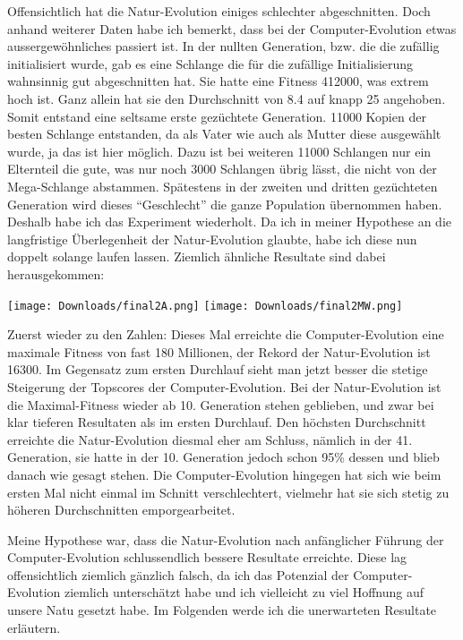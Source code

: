 \documentclass[11pt,a4paper,ngerman]{article}
\begin{document}
\bigskip
Offensichtlich hat die Natur-Evolution einiges schlechter abgeschnitten. Doch anhand weiterer Daten habe ich bemerkt, dass bei der Computer-Evolution etwas aussergewöhnliches passiert ist. In der nullten Generation, bzw. die die zufällig initialisiert wurde, gab es eine Schlange die für die zufällige Initialisierung wahnsinnig gut abgeschnitten hat. Sie hatte eine Fitness 412000, was extrem hoch ist. Ganz allein hat sie den Durchschnitt von 8.4 auf knapp 25 angehoben. Somit entstand eine seltsame erste gezüchtete Generation. 11000 Kopien der besten Schlange entstanden, da als Vater wie auch als Mutter diese ausgewählt wurde, ja das ist hier möglich. Dazu ist bei weiteren 11000 Schlangen nur ein Elternteil die gute, was nur noch 3000 Schlangen übrig lässt, die nicht von der Mega-Schlange abstammen. Spätestens in der zweiten und dritten gezüchteten Generation wird dieses \enquote{Geschlecht} die ganze Population übernommen haben. Deshalb habe ich das Experiment wiederholt. Da ich in meiner Hypothese an die langfristige Überlegenheit der Natur-Evolution glaubte, habe ich diese nun doppelt solange laufen lassen. Ziemlich ähnliche Resultate sind dabei herausgekommen:

\begin{center}
    \texttt{[image: Downloads/final2A.png]}
    \texttt{[image: Downloads/final2MW.png]}
\end{center}

Zuerst wieder zu den Zahlen: Dieses Mal erreichte die Computer-Evolution eine maximale Fitness von fast 180 Millionen, der Rekord der Natur-Evolution ist 16300. Im Gegensatz zum ersten Durchlauf sieht man jetzt besser die stetige Steigerung der Topscores der Computer-Evolution. Bei der Natur-Evolution ist die Maximal-Fitness wieder ab 10. Generation stehen geblieben, und zwar bei klar tieferen Resultaten als im ersten Durchlauf. Den höchsten Durchschnitt erreichte die Natur-Evolution diesmal eher am Schluss, nämlich in der 41. Generation, sie hatte in der 10. Generation jedoch schon 95\% dessen und blieb danach wie gesagt stehen. Die Computer-Evolution hingegen hat sich wie beim ersten Mal nicht einmal im Schnitt verschlechtert, vielmehr hat sie sich stetig zu höheren Durchschnitten emporgearbeitet.

\bigskip
Meine Hypothese war, dass die Natur-Evolution nach anfänglicher Führung der Computer-Evolution schlussendlich bessere Resultate erreichte. Diese lag offensichtlich ziemlich gänzlich falsch, da ich das Potenzial der Computer-Evolution ziemlich unterschätzt habe und ich vielleicht zu viel Hoffnung auf unsere Natu gesetzt habe. Im Folgenden werde ich die unerwarteten Resultate erläutern.
\end{document}

